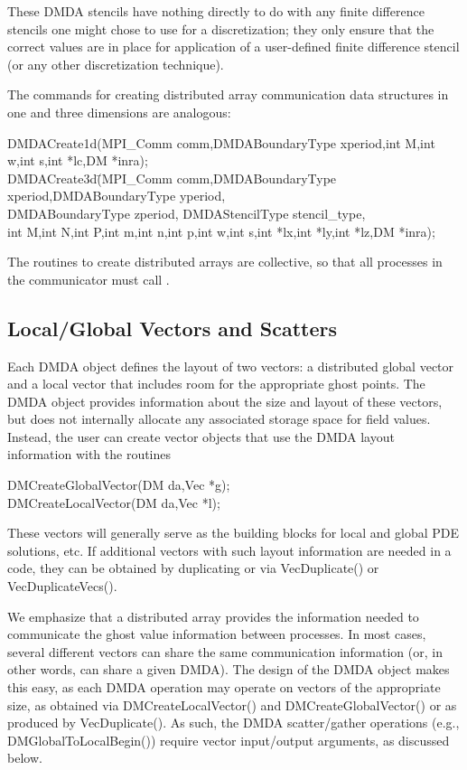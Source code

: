 These DMDA stencils have nothing directly to do with any finite
difference stencils one might chose to use for a discretization; they
only ensure that the correct values are in place for application of a
user-defined finite difference stencil (or any other
discretization technique).

The commands for creating distributed array communication data structures
in one and three dimensions are analogous:
\begin{tabbing}
  DMDACreate1d(MPI\_Comm comm,DMDABoundaryType xperiod,int M,int w,int s,int *lc,DM *inra);\\
  DMDACreate3d\=(MPI\_Comm comm,DMDABoundaryType xperiod,DMDABoundaryType yperiod, \\
             \> DMDABoundaryType zperiod, DMDAStencilType stencil\_type,\\
             \>int M,int N,int P,int m,int n,int p,int w,int s,int *lx,int *ly,int *lz,DM *inra);
\end{tabbing}
The routines to create distributed arrays are collective, so that all
processes in the communicator  must call .

\subsection{Local/Global Vectors and Scatters}

Each DMDA object defines the layout of two vectors: a distributed
global vector and a local vector that includes room for the
appropriate ghost points.  The DMDA object provides information
about the size and layout of these vectors, but does not internally
allocate any associated storage space for field values.  Instead, the
user can create vector objects that use the DMDA layout
information with the routines
\begin{tabbing}
  DMCreateGlobalVector(DM da,Vec *g);\\
  DMCreateLocalVector(DM da,Vec *l);
\end{tabbing}
These vectors will generally serve as the building blocks for local
and global PDE solutions, etc.  If additional vectors with such
layout information are needed in a code, they can be obtained by
duplicating  or  via
VecDuplicate() or VecDuplicateVecs().

We emphasize that a distributed array provides the information needed
to communicate the ghost value information between processes.  In most
cases, several different vectors can share the same communication
information (or, in other words, can share a given DMDA).  The
design of the DMDA object makes this easy, as each DMDA
operation may operate on vectors of the appropriate size, as obtained
via DMCreateLocalVector() and DMCreateGlobalVector() or as
produced by VecDuplicate().  As such, the DMDA
scatter/gather operations (e.g., DMGlobalToLocalBegin()) require
vector input/output arguments, as discussed below.

